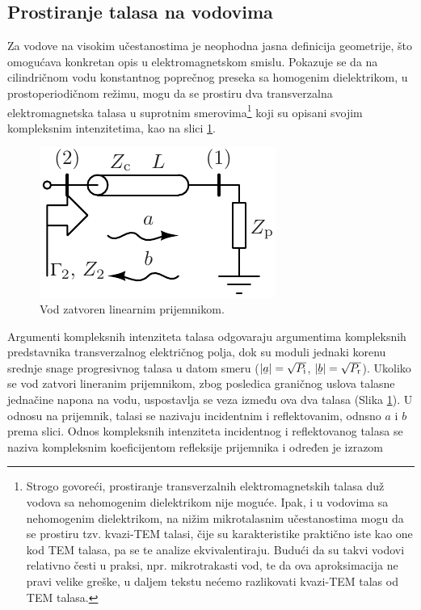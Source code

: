 \documentclass[a4paper, 12pt, diplomski]{etf}
\newcommand{\faz}[1]{\underaccent{\bar}{#1}}
\begin{document}
\subsection{Prostiranje talasa na vodovima}
Za vodove na visokim učestanostima je neophodna jasna 
definicija geometrije, što omogućava konkretan opis u elektromagnetskom
smislu.
Pokazuje se da na cilindričnom vodu konstantnog poprečnog preseka sa homogenim dielektrikom,
u prostoperiodičnom režimu, 
mogu da se
prostiru dva transverzalna elektromagnetska talasa u suprotnim smerovima\footnote{
Strogo govoreći, prostiranje transverzalnih elektromagnetskih talasa duž vodova sa nehomogenim
dielektrikom nije moguće. Ipak, i u vodovima sa nehomogenim dielektrikom, na nižim mikrotalasnim 
učestanostima mogu da se prostiru tzv. kvazi-TEM talasi, čije su karakteristike praktično iste kao
one kod TEM talasa, pa se te analize ekvivalentiraju. Budući da su takvi vodovi relativno česti u praksi,
npr. mikrotrakasti vod, te da ova aproksimacija ne pravi velike greške, u daljem tekstu nećemo razlikovati kvazi-TEM talas od TEM talasa.
} koji su opisani svojim
kompleksnim intenzitetima,
kao na slici \ref{load}.
%
%
\begin{figure}[b]
    \centering
    \includegraphics{fig/prijemnik.pdf}
    \caption{Vod zatvoren linearnim prijemnikom.
    }
    \label{load}
\end{figure}
%
Argumenti kompleksnih intenziteta talasa odgovaraju 
argumentima kompleksnih predstavnika transverzalnog električnog polja,
dok su moduli jednaki korenu
srednje snage progresivnog talasa u datom smeru 
($|\faz a| = \sqrt{P_{\rm i}}$, 
$|\faz b| = \sqrt{P_{\rm r}}$).
Ukoliko se vod zatvori lineranim prijemnikom, zbog posledica graničnog uslova talasne 
jednačine napona na vodu, uspostavlja se veza između ova dva talasa (Slika \ref{load}). U odnosu na 
prijemnik, talasi se nazivaju incidentnim i reflektovanim, odnsno $a$ i $b$ prema slici. Odnos kompleksnih intenziteta incidentnog
i reflektovanog talasa se naziva kompleksnim 
koeficijentom refleksije prijemnika i određen je izrazom
\end{document}
